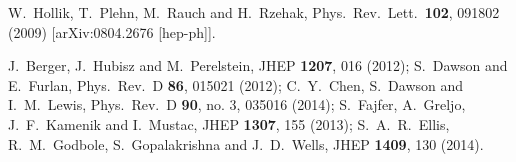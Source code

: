   W.~Hollik, T.~Plehn, M.~Rauch and H.~Rzehak,
  Phys.\ Rev.\ Lett.\  {\bf 102}, 091802 (2009)
  [arXiv:0804.2676 [hep-ph]].

  J.~Berger, J.~Hubisz and M.~Perelstein,
  JHEP {\bf 1207}, 016 (2012);
  S.~Dawson and E.~Furlan,
  Phys.\ Rev.\ D {\bf 86}, 015021 (2012);
  C.~Y.~Chen, S.~Dawson and I.~M.~Lewis,
  Phys.\ Rev.\ D {\bf 90}, no. 3, 035016 (2014);
  S.~Fajfer, A.~Greljo, J.~F.~Kamenik and I.~Mustac,
  JHEP {\bf 1307}, 155 (2013);
  S.~A.~R.~Ellis, R.~M.~Godbole, S.~Gopalakrishna and J.~D.~Wells,
  JHEP {\bf 1409}, 130 (2014).


